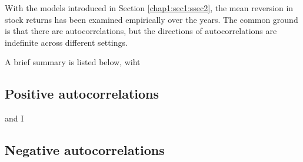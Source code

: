 With the models introduced in Section \ref{chap1:sec1:ssec2}, the mean reversion in stock returns
has been examined empirically over the years. The common ground is that there are autocorrelations,
but the directions of autocorrelations are indefinite across different settings.

A brief summary is listed below, wiht 

\subsection{Positive autocorrelations}
and I 

\subsection{Negative autocorrelations}

